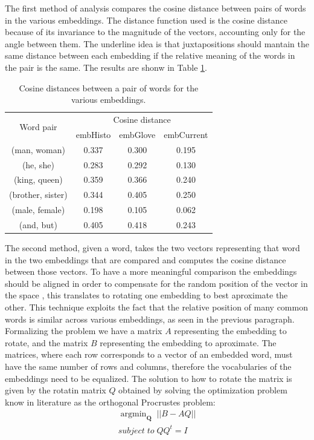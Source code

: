 \documentclass[runningheads]{llncs}
\begin{document}
The first method of analysis compares the cosine distance between pairs of words in the various embeddings. The distance function used is the cosine distance because of its invariance to the magnitude of the vectors, accounting only for the angle between them. The underline idea is that juxtapositions should mantain the same distance between each embedding if the relative meaning of the words in the pair is the same. The results are shonw in Table \ref{tab:juxtapos}.

\begin{table}
\centering
\caption{Cosine distances between a pair of words for the various embeddings.}
\label{tab:juxtapos}
\begin{tabular}{|c|c|c|c|}
\hline
\multirow{2}{*}{Word pair} & \multicolumn{3}{|c|}{Cosine distance}\\\cline{2-4}
&embHisto&embGlove&embCurrent\\
\hline
(man, woman) &  0.337 & 0.300 & 0.195\\
(he, she) & 0.283 & 0.292 & 0.130\\
(king, queen) & 0.359 & 0.366 & 0.240\\
(brother, sister) & 0.344 & 0.405 & 0.250\\
(male, female) & 0.198 & 0.105 & 0.062\\
(and, but) & 0.405 & 0.418 & 0.243\\
\hline
\end{tabular}
\end{table}

The second method, given a word, takes the two vectors representing that word in the two embeddings that are compared and computes the cosine distance between those vectors. To have a more meaningful comparison the embeddings should be aligned in order to compensate for the random position of the vector in the space \cite{embcomp}, this translates to rotating one embedding to best aproximate the other. This technique exploits the fact that the relative position of many common words is similar across various embeddings, as seen in the previous paragraph. Formalizing the problem we have a matrix $A$ representing the embedding to rotate, and the matrix $B$ representing the embedding to aproximate. The matrices, where each row corresponds to a vector of an embedded word, must have the same number of rows and columns, therefore the vocabularies of the embeddings need to be equalized. The solution to how to rotate the matrix is given by the rotatin matrix $Q$ obtained by solving the optimization problem know in literature as the orthogonal Procrustes problem:
\begin{align*}
\mathop{argmin}_{\textbf{Q}}\; ||B - AQ|| \\
subject\; to\; QQ^t = I
\end{align*}
\end{document}
